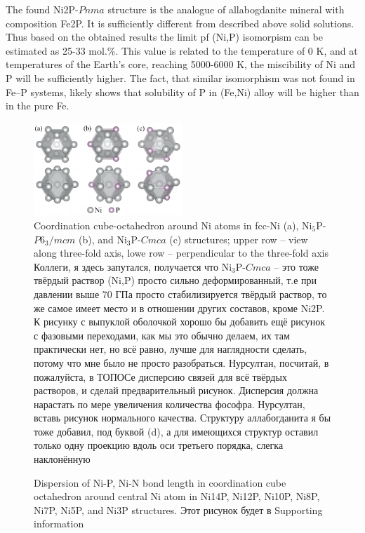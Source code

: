 \documentclass[twoside,twocolumn,9pt]{article}
\begin{document}
The found Ni2P-$Pnma$ structure is the analogue of allabogdanite mineral with composition Fe2P.
It is sufficiently different from described above solid solutions. 
Thus based on the obtained results the limit pf (Ni,P) isomorpism can be estimated as 25-33 mol.\%.
This value is related to the temperature of 0 K, and at temperatures of the Earth's core, reaching 5000-6000 K, the miscibility of Ni and P will be sufficiently higher.
The fact, that similar isomorphism was not found in Fe--P systems, likely shows that solubility of P in (Fe,Ni) alloy will be higher than in the pure Fe.

\begin{figure}
	\includegraphics[width=0.5\textwidth]{str_ss}
	\caption{Coordination cube-octahedron around Ni atoms in fcc-Ni (a), Ni$_5$P-$P6_3/mcm$ (b), and Ni$_3$P-$Cmca$ (c) structures; upper row – view along three-fold axis, lowe row – perpendicular to the three-fold axis
	Коллеги, я здесь запутался, получается что Ni$_3$P-$Cmca$ – это тоже твёрдый раствор (Ni,P) просто сильно деформированный, т.е при давлении выше 70 ГПа просто стабилизируется твёрдый раствор, то же самое имеет место и в отношении других составов, кроме Ni2P. К рисунку с выпуклой оболочкой хорошо бы добавить ещё рисунок с фазовыми переходами, как мы это обычно делаем, их там практически нет, но всё равно, лучше для наглядности сделать, потому что мне было не просто разобраться. Нурсултан, посчитай, в пожалуйста, в ТОПОСе дисперсию связей для всё твёрдых растворов, и сделай предварительный рисунок. Дисперсия должна нарастать по мере увеличения количества фософра.   Нурсултан, вставь рисунок нормального качества. Структуру аллабогданита я бы тоже добавил, под буквой (d), а для имеющихся структур оставил только одну проекцию вдоль оси третьего порядка, слегка наклонённую }\label{f:strs}
\end{figure}

\begin{figure}
\caption{Dispersion of Ni-P, Ni-N bond length in coordination cube octahedron around central Ni atom in Ni14P, Ni12P, Ni10P, Ni8P, Ni7P, Ni5P, and Ni3P structures. Этот рисунок будет в Supporting information} \label{f:d_dist}
\end{figure}
\end{document}
